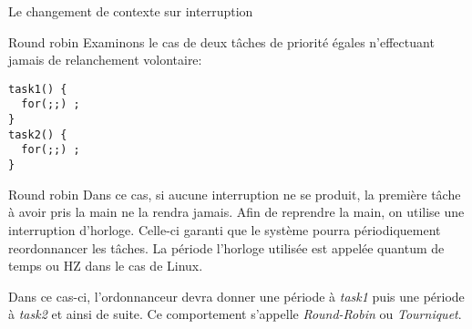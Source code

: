 \begin{frame}{Le changement de contexte sur interruption}
  \begin{center}
  \end{center}
\end{frame}

\begin{frame}[fragile]{Round robin}
  Examinons  le cas de  deux tâches  de priorité  égales n'effectuant
  jamais de relanchement volontaire:
  \begin{lstlisting}
task1() {
  for(;;) ;
}
task2() {
  for(;;) ;
}
  \end{lstlisting}
\end{frame}

\begin{frame}[fragile]{Round robin}
  Dans ce cas, si aucune interruption ne se produit, la première tâche
  à avoir pris la main ne la rendra jamais. Afin de reprendre la main,
  on  utilise une  interruption  d'horloge.  Celle-ci  garanti que  le
  système  pourra périodiquement  reordonnancer les  tâches.  La période
  l'horloge utilisée est appelée quantum de temps ou HZ dans le cas de
  Linux.

  Dans   ce  cas-ci,   l'ordonnanceur  devra   donner  une   période  à
  \emph{task1} puis une période à  \emph{task2} et ainsi de suite.  Ce
  comportement s'appelle \emph{Round-Robin} ou \emph{Tourniquet}.
  \begin{center}
    
  \end{center}
\end{frame}




